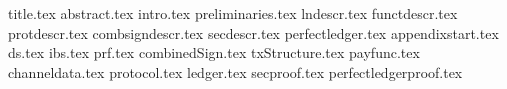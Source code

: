 \documentclass[conference,compsoc]{IEEEtran}
\begin{document}
\pagestyle{plain}
{title.tex}
{abstract.tex}
{intro.tex}
{preliminaries.tex}
{lndescr.tex}
{functdescr.tex}
{protdescr.tex}
{combsigndescr.tex}
{secdescr.tex}
{perfectledger.tex}
{appendixstart.tex}
{ds.tex}
{ibs.tex}
{prf.tex}
{combinedSign.tex}
{txStructure.tex}
{payfunc.tex}
{channeldata.tex}
{protocol.tex}
{ledger.tex}
{secproof.tex}
{perfectledgerproof.tex}



\end{document}
